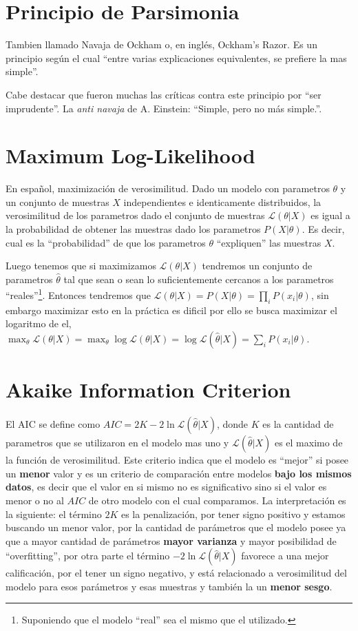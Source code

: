 \documentclass[10pt,a4paper]{article}
\begin{document}
\section{Principio de Parsimonia}
Tambien llamado Navaja de Ockham o, en inglés, Ockham's Razor. Es un principio según el cual ``entre varias explicaciones equivalentes, se prefiere la mas simple''. 

Cabe destacar que fueron muchas las críticas contra este principio por ``ser imprudente''. La \textit{anti navaja} de A. Einstein: ``Simple, pero no más simple.''.

\section{Maximum Log-Likelihood}
En español, maximización de verosimilitud. Dado un modelo con parametros $\theta$ y un conjunto de muestras $X$ independientes e identicamente distribuidos, la verosimilitud de los parametros dado el conjunto de muestras $\mathcal{L}(\theta|X)$ es igual a la probabilidad de obtener las muestras dado los parametros $P(X|\theta)$. Es decir, cual es la ``probabilidad'' de que los parametros $\theta$ ``expliquen'' las muestras $X$.

Luego tenemos que si maximizamos $\mathcal{L}(\theta|X)$ tendremos un conjunto de parametros $\hat{\theta}$ tal que sean o sean lo suficientemente cercanos a los parametros ``reales''\footnote{Suponiendo que el modelo ``real'' sea el mismo que el utilizado.}. Entonces tendremos que $\mathcal{L}(\theta|X) = P(X|\theta) = \prod_i P(x_i|\theta)$, sin embargo maximizar esto en la práctica es dificil por ello se busca maximizar el logaritmo de el, $\max_\theta \mathcal{L}(\theta|X) = \max_\theta \log \mathcal{L}(\theta|X) = \log \mathcal{L}(\hat{\theta}|X)= \sum_i P(x_i|\theta)$.

\section{Akaike Information Criterion}\label{modelselection_aic}
El AIC se define como $AIC = 2K - 2\ln{\mathcal{L}(\hat{\theta}|X)}$, donde $K$ es la cantidad de parametros que se utilizaron en el modelo mas uno y $\mathcal{L}(\hat{\theta}|X)$ es el maximo de la función de verosimilitud. Este criterio indica que el modelo es ``mejor'' si posee un \textbf{menor} valor y es un criterio de comparación entre modelos \textbf{bajo los mismos datos}, es decir que el valor en si mismo no es significativo sino si el valor es menor o no al $AIC$ de otro modelo con el cual comparamos. La interpretación es la siguiente: el término $2K$ es la penalización, por tener signo positivo y estamos buscando un menor valor, por la cantidad de parámetros que el modelo posee ya que a mayor cantidad de parámetros \textbf{mayor varianza} y mayor posibilidad de ``overfitting'', por otra parte el término $-2 \ln{\mathcal{L}(\hat{\theta}|X)}$ favorece a una mejor calificación, por el tener un signo negativo, y está relacionado a verosimilitud del modelo para esos parámetros y esas muestras y también la un \textbf{menor sesgo}\cite{Hu07}.
\end{document}
